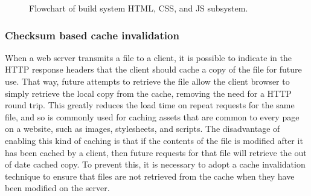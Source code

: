 \begin{figure}[H]
\caption[Flowchart of build system HTML, CSS, and JS subsystem]
        {Flowchart of build system HTML, CSS, and JS subsystem.}
\label{fig:build-system-flowchart}
\end{figure}


\subsubsection*{Checksum based cache invalidation}

When a web server transmits a file to a client, it is possible to
indicate in the HTTP response headers that the client should cache a
copy of the file for future use. That way, future attempts to retrieve
the file allow the client browser to simply retrieve the local copy
from the cache, removing the need for a HTTP round trip. This greatly
reduces the load time on repeat requests for the same file, and so is
commonly used for caching assets that are common to every page on a
website, such as images, stylesheets, and scripts. The disadvantage of
enabling this kind of caching is that if the contents of the file is
modified after it has been cached by a client, then future requests
for that file will retrieve the out of date cached copy. To prevent
this, it is necessary to adopt a cache invalidation technique to
ensure that files are not retrieved from the cache when they have been
modified on the server.

